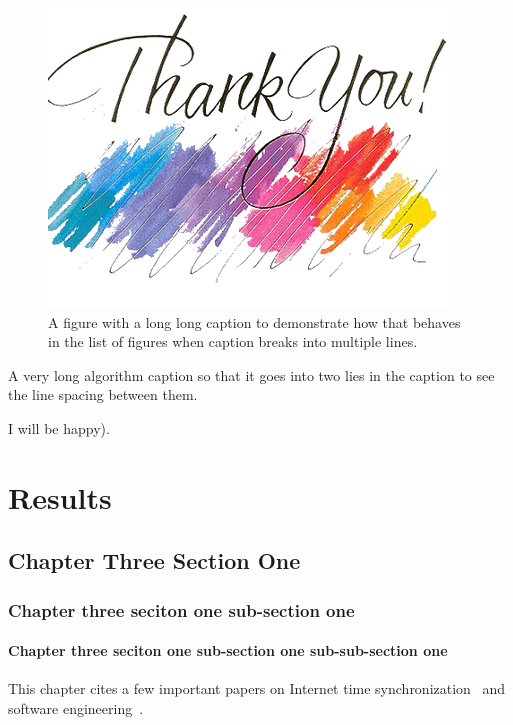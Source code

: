 \begin{figure}[htb!]
	\centering
		\includegraphics{thank_you}
	\caption{A figure with a long long caption to demonstrate how that behaves in the list of figures when caption breaks into multiple lines.}
\end{figure}



\begin{algorithm}[htb!]
	\caption{A very long algorithm caption so that it goes into two lies in the caption to see the line spacing between them.}
	\begin{algorithmic}[1]
					\State I will be happy).
				\EndIf
	\end{algorithmic}
\end{algorithm}



\chapter{Results}
\section{Chapter Three Section One}
\subsection{Chapter three seciton one sub-section one}
\subsubsection{Chapter three seciton one sub-section one sub-sub-section one}
%
This chapter cites a few important papers on Internet time synchronization~\cite[]{NTP} and 
software engineering~\cite[]{berkeley,ahrens2014image}.


